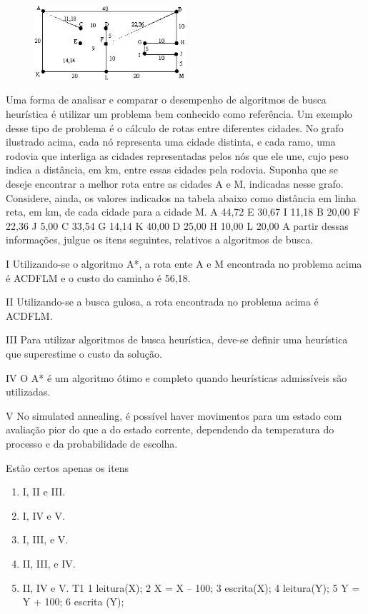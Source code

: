 \documentclass{exam}
\begin{document}
\begin{questions}
\begin{figure}[H]
	\begin{center}
		\includegraphics[width=0.5\textwidth]{CIENCIA_DA_COMPUTACAO_Prova2005-utf8_figuras/fig-0020.jpg}
	\end{center}
\end{figure}
Uma forma de analisar e comparar o desempenho de algoritmos
de busca heurística é utilizar um problema bem conhecido como
referência. Um exemplo desse tipo de problema é o cálculo de
rotas entre diferentes cidades. No grafo ilustrado acima, cada nó
representa uma cidade distinta, e cada ramo, uma rodovia que
interliga as cidades representadas pelos nós que ele une, cujo peso
indica a distância, em km, entre essas cidades pela rodovia.
Suponha que se deseje encontrar a melhor rota entre as cidades A
e M, indicadas nesse grafo. Considere, ainda, os valores indicados
na tabela abaixo como distância em linha reta, em km, de cada
cidade para a cidade M.
A 44,72 E 30,67 I 11,18
B 20,00 F 22,36 J 5,00
C 33,54 G 14,14 K 40,00
D 25,00 H 10,00 L 20,00
A partir dessas informações, julgue os itens seguintes, relativos a
algoritmos de busca.

I Utilizando-se o algoritmo A*, a rota ente A e M encontrada no
problema acima é ACDFLM e o custo do caminho é 56,18.

II Utilizando-se a busca gulosa, a rota encontrada no problema
acima é ACDFLM.

III Para utilizar algoritmos de busca heurística, deve-se definir
uma heurística que superestime o custo da solução.

IV O A* é um algoritmo ótimo e completo quando heurísticas
admissíveis são utilizadas.

V No simulated annealing, é possível haver movimentos para um
estado com avaliação pior do que a do estado corrente,
dependendo da temperatura do processo e da probabilidade
de escolha.

Estão certos apenas os itens
	\begin{enumerate}[label=\alph*)]
		\item  I, II e III.
		\item  I, IV e V.
		\item  I, III, e V.
		\item  II, III, e IV.
		\item  II, IV e V.
T1
1 leitura(X);
2 X = X – 100;
3 escrita(X);
4 leitura(Y);
5 Y = Y + 100;
6 escrita (Y);
	\end{enumerate}


\end{questions}
\end{document}

